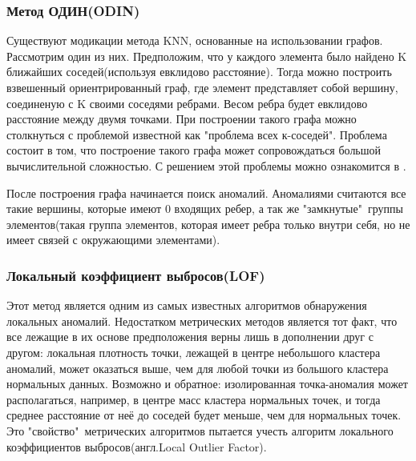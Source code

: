  \subsubsection{Метод ОДИН(ODIN)}
 Существуют модикации метода KNN, основанные на использовании графов. Рассмотрим один из них. Предположим, что у каждого элемента было найдено K ближайших соседей(используя евклидово расстояние). Тогда можно построить взвешенный ориентрированный граф, где  элемент представляет собой вершину, соединеную с K своими соседями ребрами\cite{Book19}. Весом ребра будет евклидово расстояние между двумя точками. При построении такого графа можно столкнуться с проблемой известной как "проблема всех к-соседей". Проблема состоит в том, что построение такого графа  может сопровождаться большой вычислительной сложностью. С решением этой проблемы можно ознакомится в \cite{Book20}.
 
 После построения графа начинается поиск аномалий. Аномалиями считаются все такие вершины, которые имеют 0 входящих ребер, а так же "замкнутые"\ группы элементов(такая группа элементов, которая имеет ребра только внутри себя, но не имеет связей с окружающими элементами).
 \subsubsection{Локальный коэффициент выбросов(LOF)}
 Этот метод является одним из самых известных алгоритмов обнаружения локальных аномалий. Недостатком метрических методов является тот факт, что все лежащие в их основе предположения верны лишь в дополнении друг с другом: локальная плотность точки, лежащей в центре небольшого кластера аномалий, может оказаться выше, чем для любой точки из большого кластера
 нормальных данных. Возможно и обратное: изолированная точка-аномалия может располагаться, например, в центре масс кластера нормальных точек, и тогда среднее расстояние от неё до соседей будет меньше, чем для нормальных точек. Это "свойство"\ метрических алгоритмов пытается учесть алгоритм  локального коэффициентов выбросов(англ.Local Outlier Factor).
 
